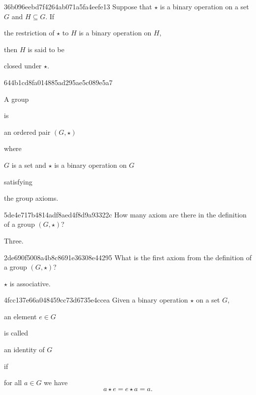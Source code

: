 \begin{note}{36b096eebd7f4264ab071a5fa4eefe13}
    Suppose that \({ \star }\) is a binary operation on a set \({ G }\) and \({ H \subseteq G }\).
    If \begin{icloze}{2}the restriction of \({ \star }\) to \({ H }\) is a binary operation on \({ H }\),\end{icloze} then \({ H }\) is said to be \begin{icloze}{1}closed under \({ \star }\).\end{icloze}
\end{note}

\begin{note}{644b1cd8fa014885ad295ae5c089e5a7}
    \begin{icloze}{3}A group\end{icloze} is \begin{icloze}{2}an ordered pair \({ (G, \star) }\)\end{icloze} where \begin{icloze}{1}\({ G }\) is a set and \({ \star }\) is a binary operation on \({ G }\)\end{icloze} satisfying \begin{icloze}{4}the group axioms.\end{icloze}
\end{note}

\begin{note}{5de4e717b4814adf8aed4f8d9a93322c}
    How many axiom are there in the definition of a group \({ (G, \star) }\)?

    \begin{cloze}{1}
        Three.
    \end{cloze}
\end{note}

\begin{note}{2de690f5008a4b8c8691e36308e44295}
    What is the first axiom from the definition of a group \({ (G, \star) }\)?

    \begin{cloze}{1}
        \({ \star }\) is associative.
    \end{cloze}
\end{note}

\begin{note}{4fcc137e66a048459cc73d6735e4ccea}
    Given a binary operation \({ \star }\) on a set \({ G }\), \begin{icloze}{3}an element \({ e \in G }\)\end{icloze} is called \begin{icloze}{2}an identity of \({ G }\)\end{icloze} if
    \begin{icloze}{1}
        for all \({ a \in G }\) we have
        \[
            a \star e = e \star a = a.
        \]
    \end{icloze}
\end{note}


